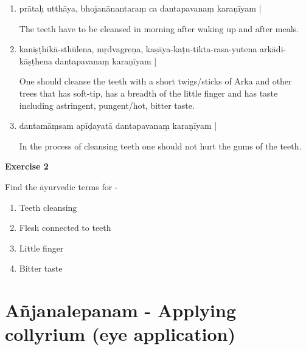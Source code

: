 \begin{enumerate}
\item {}

prātaḥ utthāya, bhojanānantaraṃ ca dantapavanaṃ karaṇīyam | 

The teeth have to be cleansed in morning after waking up and after meals.

\item {}

kaniṣṭhikā-sthūlena, mṛdvagreṇa, kaṣāya-kaṭu-tikta-rasa-yutena arkādi-kāṣṭhena dantapavanaṃ karaṇīyam |  

One should cleanse the teeth with a short twigs/sticks of Arka and other trees that has soft-tip, has a breadth of the little finger and has taste including astringent, pungent/hot, bitter taste.  

\item {}

dantamāṃsam apīḍayatā dantapavanaṃ karaṇīyam |

In the process of cleansing teeth one should not hurt the gums of the teeth.
\end{enumerate}

\begin{center}
\textbf{\large Exercise 2}
\end{center}

Find the āyurvedic terms for - 
\begin{enumerate}
\renewcommand{\theenumi}{\alph{enumi}}
\renewcommand{\labelenumi}{\theenumi.}
\item Teeth cleansing
\item Flesh connected to teeth
\item Little finger
\item Bitter taste
\end{enumerate}

\chapter{Añjanalepanam - Applying collyrium (eye application)}

